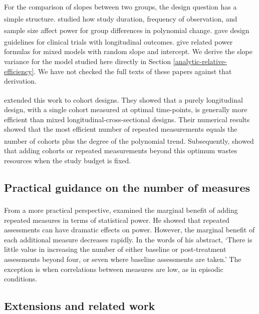 \documentclass[
  11pt,
]{article}
\begin{document}
For the comparison of slopes between two groups, the design
question has a simple structure.\textsuperscript{} studied
how study duration, frequency of observation, and sample size
affect power for group differences in polynomial change.\textsuperscript{} gave design guidelines for clinical
trials with longitudinal outcomes.\textsuperscript{} give related power
formulas for mixed models with random slope and intercept. We
derive the slope variance for the model studied here directly in
Section \ref{analytic-relative-efficiency}. We have not checked
the full texts of these papers against that derivation.

\textsuperscript{} extended this work to cohort designs. They
showed that a purely longitudinal design, with a single cohort
measured at optimal time-points, is generally more efficient than
mixed longitudinal-cross-sectional designs. Their numerical
results showed that the most efficient number of repeated
measurements equals the number of cohorts plus the degree of the
polynomial trend. Subsequently,\textsuperscript{} showed that
adding cohorts or repeated measurements beyond this optimum
wastes resources when the study budget is fixed.

\subsection{Practical guidance on the number of measures}\label{practical-guidance-on-the-number-of-measures}

From a more practical perspective,\textsuperscript{} examined
the marginal benefit of adding repeated measures in terms of
statistical power. He showed that repeated assessments can have
dramatic effects on power. However, the marginal benefit of each
additional measure decreases rapidly. In the words of his
abstract, `There is little value in increasing the number of
either baseline or post-treatment assessments beyond four, or
seven where baseline assessments are taken.' The exception is
when correlations between measures are low, as in episodic
conditions.

\subsection{Extensions and related work}\label{extensions-and-related-work}
\end{document}
